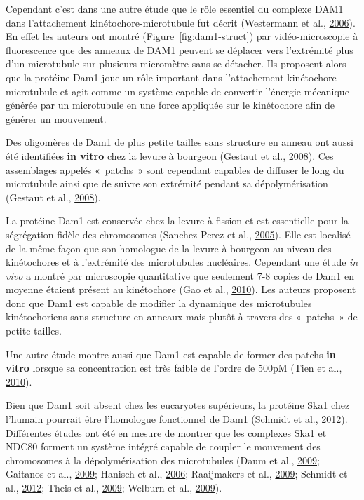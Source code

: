 \documentclass[12pt,a4paper,twoside,openright]{book}
\begin{document}
Cependant c'est dans une autre étude que le rôle essentiel du complexe
DAM1 dans l'attachement kinétochore-microtubule fut décrit (Westermann
et al., \protect\hyperlink{ref-Westermann2006}{2006}). En effet les
auteurs ont montré (Figure~\ref{fig:dam1-struct}) par vidéo-microscopie
à fluorescence que des anneaux de DAM1 peuvent se déplacer vers
l'extrémité plus d'un microtubule sur plusieurs micromètre sans se
détacher. Ils proposent alors que la protéine Dam1 joue un rôle
important dans l'attachement kinétochore-microtubule et agit comme un
système capable de convertir l'énergie mécanique générée par un
microtubule en une force appliquée sur le kinétochore afin de générer un
mouvement.

Des oligomères de Dam1 de plus petite tailles sans structure en anneau
ont aussi été identifiées \textbf{in vitro} chez la levure à bourgeon
(Gestaut et al., \protect\hyperlink{ref-Gestaut2008}{2008}). Ces
assemblages appelés «~patchs~» sont cependant capables de diffuser le
long du microtubule ainsi que de suivre son extrémité pendant sa
dépolymérisation (Gestaut et al.,
\protect\hyperlink{ref-Gestaut2008}{2008}).

La protéine Dam1 est conservée chez la levure à fission et est
essentielle pour la ségrégation fidèle des chromosomes (Sanchez-Perez et
al., \protect\hyperlink{ref-Sanchez-Perez2005}{2005}). Elle est localisé
de la même façon que son homologue de la levure à bourgeon au niveau des
kinétochores et à l'extrémité des microtubules nucléaires. Cependant une
étude \emph{in vivo} a montré par microscopie quantitative que seulement
7-8 copies de Dam1 en moyenne étaient présent au kinétochore (Gao et
al., \protect\hyperlink{ref-Gao2010}{2010}). Les auteurs proposent donc
que Dam1 est capable de modifier la dynamique des microtubules
kinétochoriens sans structure en anneaux mais plutôt à travers des
«~patchs~» de petite tailles.

Une autre étude montre aussi que Dam1 est capable de former des patchs
\textbf{in vitro} lorsque sa concentration est très faible de l'ordre de
500pM (Tien et al., \protect\hyperlink{ref-Tien2010}{2010}).

Bien que Dam1 soit absent chez les eucaryotes supérieurs, la protéine
Ska1 chez l'humain pourrait être l'homologue fonctionnel de Dam1
(Schmidt et al., \protect\hyperlink{ref-Schmidt2012}{2012}). Différentes
études ont été en mesure de montrer que les complexes Ska1 et NDC80
forment un système intégré capable de coupler le mouvement des
chromosomes à la dépolymérisation des microtubules (Daum et al.,
\protect\hyperlink{ref-Daum2009}{2009}; Gaitanos et al.,
\protect\hyperlink{ref-Gaitanos2009}{2009}; Hanisch et al.,
\protect\hyperlink{ref-Hanisch2006}{2006}; Raaijmakers et al.,
\protect\hyperlink{ref-Raaijmakers2009}{2009}; Schmidt et al.,
\protect\hyperlink{ref-Schmidt2012}{2012}; Theis et al.,
\protect\hyperlink{ref-Theis2009}{2009}; Welburn et al.,
\protect\hyperlink{ref-Welburn2009}{2009}).
\end{document}
